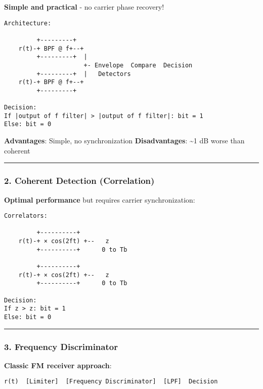 \textbf{Simple and practical} - no carrier phase recovery!

\begin{verbatim}
Architecture:

         +---------+
    r(t)-+ BPF @ f+--+
         +---------+  |
                      +- Envelope  Compare  Decision
         +---------+  |   Detectors
    r(t)-+ BPF @ f+--+
         +---------+

Decision:
If |output of f filter| > |output of f filter|: bit = 1
Else: bit = 0
\end{verbatim}

\textbf{Advantages}: Simple, no synchronization \textbf{Disadvantages}:
\textasciitilde1 dB worse than coherent

\begin{center}\rule{0.5\linewidth}{0.5pt}\end{center}

\subsubsection{2. Coherent Detection
(Correlation)}\label{coherent-detection-correlation}

\textbf{Optimal performance} but requires carrier synchronization:

\begin{verbatim}
Correlators:

         +----------+
    r(t)-+ × cos(2ft) +--   z
         +----------+      0 to Tb

         +----------+
    r(t)-+ × cos(2ft) +--   z
         +----------+      0 to Tb

Decision:
If z > z: bit = 1
Else: bit = 0
\end{verbatim}

\begin{center}\rule{0.5\linewidth}{0.5pt}\end{center}

\subsubsection{3. Frequency
Discriminator}\label{frequency-discriminator}

\textbf{Classic FM receiver approach}:

\begin{verbatim}
r(t)  [Limiter]  [Frequency Discriminator]  [LPF]  Decision
\end{verbatim}

